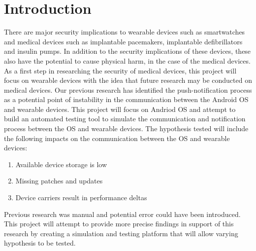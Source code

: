 \section{Introduction}
There are major security implications to wearable devices such as smartwatches and  medical devices such as implantable pacemakers, implantable defibrillators and insulin pumps.\cite{do_is_2017}\cite{mills_wearing_2016}\cite{park_this_2016}\cite{halperin_pacemakers_2008}\cite{halperin_pacemakers_2008-1}\cite{al-sharrah_watch_2018}
In addition to the security implications of these devices, these also have the potential to cause physical harm, in the case of the medical devices.
As a first step in researching the security of medical devices, this project will focus on wearable devices with the idea that future research may be conducted on medical devices.
Our previous research has identified the push-notification process\cite{sultana_wearable_nodate} as a potential point of instability in the communication between the Android OS and wearable devices. 
This project will focus on Andriod OS and attempt to build an automated testing tool to simulate the communication and notification process between the OS and wearable devices.
The hypothesis tested will include the following impacts on the communication between the OS and wearable devices:
\begin{enumerate}
 \item Available device storage is low
 \item Missing patches and updates 
 \item Device carriers result in performance deltas
\end{enumerate}
Previous research was manual and potential error could have been introduced. 
This project will attempt to provide more precise findings in support of this research by creating a simulation and testing platform that will allow varying hypothesis to be tested.

